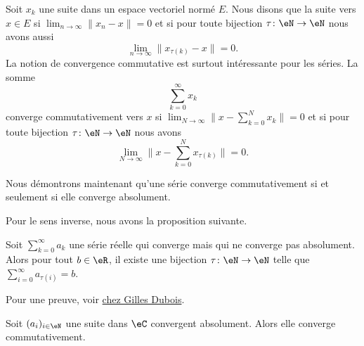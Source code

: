 \begin{definition}
    Soit \( x_k\) une suite dans un espace vectoriel normé \( E\). Nous disons que la suite  vers \( x\in E\) si \( \lim_{n\to \infty}\| x_n-x \| =0\) et si pour toute bijection \( \tau\colon \eN\to \eN\) nous avons aussi
    \begin{equation}
        \lim_{n\to \infty} \| x_{\tau(k)}-x \|=0.
    \end{equation}
    La notion de convergence commutative est surtout intéressante pour les séries. La somme
    \begin{equation}
        \sum_{k=0}^{\infty}x_k
    \end{equation}
    converge commutativement vers \( x\) si \( \lim_{N\to \infty} \| x-\sum_{k=0}^Nx_k \|=0\) et si pour toute bijection \( \tau\colon \eN\to \eN\) nous avons
    \begin{equation}
        \lim_{N\to \infty} \| x-\sum_{k=0}^Nx_{\tau(k)} \|=0.
    \end{equation}
\end{definition}

Nous démontrons maintenant qu'une série converge commutativement si et seulement si elle converge absolument.

Pour le sens inverse, nous avons la proposition suivante.
\begin{proposition}
    Soit \( \sum_{k=0}^{\infty}a_k\) une série réelle qui converge mais qui ne converge pas absolument. Alors pour tout \( b\in \eR\), il existe une bijection \( \tau\colon \eN\to \eN\) telle que \( \sum_{i=0}^{\infty}a_{\tau(i)}=b\).
\end{proposition}
Pour une preuve, voir \href{http://gilles.dubois10.free.fr/analyse_reelle/seriescomconv.html}{chez Gilles Dubois}.

\begin{proposition} \label{PopriXWvIY}
    Soit \( (a_i)_{i\in \eN}\) une suite dans \( \eC\) convergent absolument. Alors elle converge commutativement.
\end{proposition}

